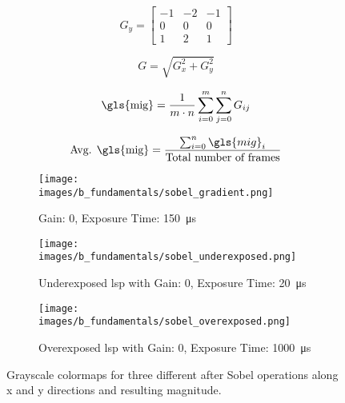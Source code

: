     \begin{equation}
        G_y = 
        \begin{bmatrix}
            -1 & -2 & -1 \\
            0 & 0 & 0 \\
            1 & 2 & 1 
        \end{bmatrix}
        \label{eqn:g_y}
    \end{equation}

    \begin{equation}
        G = \sqrt{G_x^2 + G_y^2}
        \label{eqn:mag_eqn}
    \end{equation}

    \begin{equation}
        \text{\gls{mig}} = \frac{1}{m \cdot n} \sum_{i=0}^{m} \sum_{j=0}^{n} G_{ij}
        \label{eqn:mig}
    \end{equation}

    \begin{equation}
        \text{Avg. \gls{mig}} = \frac{\sum_{i=0}^{n} \gls{mig}_i}{\text{Total number of frames}}
        \label{eqn:avg_mig}
    \end{equation}

    \begin{figure}[h]
        \centering
        \begin{subfigure}[b]{0.95\textwidth}
            \centering
            \texttt{[image: images/b\_fundamentals/sobel\_gradient.png]}
            \caption{Gain: 0, Exposure Time: \SI{150}{\micro\second}}
            \label{fig:sobel_gradient.png}
        \end{subfigure}
        \begin{subfigure}[b]{0.95\textwidth}
            \centering
            \texttt{[image: images/b\_fundamentals/sobel\_underexposed.png]}
            \caption{Underexposed \gls{lsp} with Gain: 0, Exposure Time: \SI{20}{\micro\second}}
            \label{fig:sobel_underexposed.png}
        \end{subfigure}
        \begin{subfigure}[b]{0.95\textwidth}
            \centering
            \texttt{[image: images/b\_fundamentals/sobel\_overexposed.png]}
            \caption{Overexposed \gls{lsp} with Gain: 0, Exposure Time: \SI{1000}{\micro\second}}
            \label{fig:sobel_overexposed.png}
        \end{subfigure}
        \caption{Grayscale colormaps for three different  after Sobel operations along x and y directions and resulting magnitude.}
        \label{fig:sobel.png}
    \end{figure}

    \clearpage